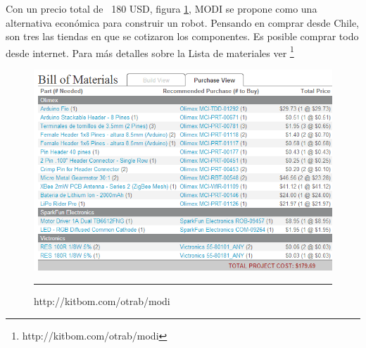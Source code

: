 Con un precio total de ~180 USD, figura \ref{fig:BOM}, MODI se propone como una alternativa económica para construir un robot. Pensando en comprar desde Chile, son tres las tiendas en que se cotizaron los componentes. Es posible comprar todo desde internet. Para más detalles sobre la Lista de materiales ver \footnote{http://kitbom.com/otrab/modi} 
\begin{figure}[htbp]
	\centering
		\includegraphics[width=\textwidth]{./Figures/MODI/kitbom.png}
		\rule{35em}{0.5pt}
	\caption[Bill Of Materials]{http://kitbom.com/otrab/modi}
	\label{fig:BOM}
\end{figure}
